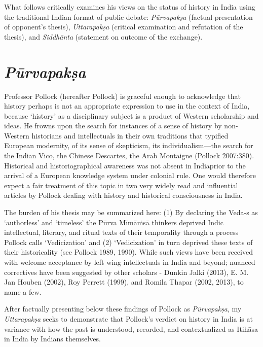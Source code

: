 What follows critically examines his views on the status of history in India using the traditional Indian format of public debate: \textit{Pūrvapakṣa} (factual presentation of opponent’s thesis), \textit{Uttarapakṣa} (critical examination and refutation of the thesis), and \textit{Siddhānta} (statement on outcome of the exchange).


\section*{\textit{Pūrvapakṣa}}

Professor Pollock (hereafter Pollock) is graceful enough to acknowledge that history perhaps is not an appropriate expression to use in the context of India, because ‘history’ as a disciplinary subject is a product of Western scholarship and ideas. He frowns upon the search for instances of a sense of history by non-Western historians and intellectuals in their own traditions that typified European modernity, of its sense of skepticism, its individualism—the search for the Indian Vico, the Chinese Descartes, the Arab Montaigne (Pollock 2007:380). Historical and historiographical awareness was not absent in India\break prior to the arrival of a European knowledge system under colonial rule. One would therefore expect a fair treatment of this topic in two very widely read and influential articles by Pollock dealing with history and historical consciousness in India.

The burden of his thesis may be summarized here: (1) By declaring the Veda-s as ‘authorless’ and ‘timeless’ the Pūrva Mīmāṁsā thinkers deprived Indic intellectual, literary, and ritual texts of their temporality through a process Pollock calls ‘Vedicization’ and (2) ‘Vedicization’ in turn deprived these texts of their historicality (see Pollock 1989, 1990). While such views have been received with welcome acceptance by left wing intellectuals in India and beyond; nuanced correctives have been suggested by other scholars - Dunkin Jalki (2013), E. M. Jan Houben (2002), Roy Perrett (1999), and Romila Thapar (2002, 2013), to name a few.

After factually presenting below these findings of Pollock as \textit{Pūrvapakṣa}, my \textit{Uttarapakṣa} seeks to demonstrate that Pollock’s verdict on history in India is at variance with how the past is understood, recorded, and contextualized as Itihāsa in India by Indians themselves.


